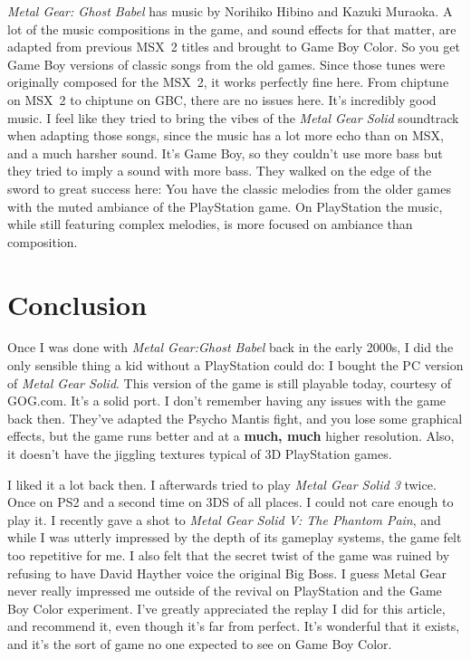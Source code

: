 \documentclass{book}
\begin{document}
\emph{Metal Gear: Ghost Babel} has music by Norihiko Hibino and Kazuki Muraoka. A lot of the music compositions in the game, and sound effects for that matter, are adapted from previous MSX 2 titles and brought to Game Boy Color. So you get Game Boy versions of classic songs from the old games. Since those tunes were originally composed for the MSX 2, it works perfectly fine here. From chiptune on MSX 2 to chiptune on GBC, there are no issues here. It’s incredibly good music. I feel like they tried to bring the vibes of the \emph{Metal Gear Solid} soundtrack when adapting those songs, since the music has a lot more echo than on MSX, and a much harsher sound. It’s Game Boy, so they couldn’t use more bass but they tried to imply a sound with more bass. They walked on the edge of the sword to great success here: You have the classic melodies from the older games with the muted ambiance of the PlayStation game. On PlayStation the music, while still featuring complex melodies, is more focused on ambiance than composition.

\FloatBarrier\needspace{10mm}\section*{Conclusion}\nopagebreak[4]

Once I was done with \emph{Metal Gear:Ghost Babel} back in the early 2000s, I did the only sensible thing a kid without a PlayStation could do: I bought the PC version of \emph{Metal Gear Solid}. This version of the game is still playable today, courtesy of GOG.com. It’s a solid port. I don’t remember having any issues with the game back then. They’ve adapted the Psycho Mantis fight, and you lose some graphical effects, but the game runs better and at a \textbf{much, much} higher resolution. Also, it doesn’t have the jiggling textures typical of 3D PlayStation games.

I liked it a lot back then. I afterwards tried to play \emph{Metal Gear Solid 3} twice. Once on PS2 and a second time on 3DS of all places. I could not care enough to play it. I recently gave a shot to \emph{Metal Gear Solid V: The Phantom Pain}, and while I was utterly impressed by the depth of its gameplay systems, the game felt too repetitive for me. I also felt that the secret twist of the game was ruined by refusing to have David Hayther voice the original Big Boss. I guess Metal Gear never really impressed me outside of the revival on PlayStation and the Game Boy Color experiment. I’ve greatly appreciated the replay I did for this article, and recommend it, even though it’s far from perfect. It’s wonderful that it exists, and it’s the sort of game no one expected to see on Game Boy Color.
\end{document}
